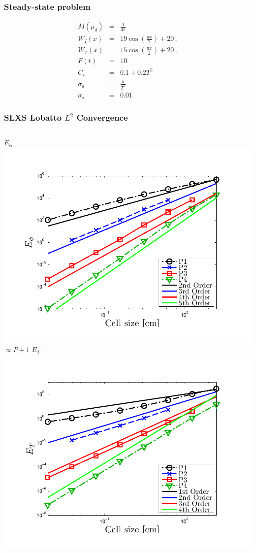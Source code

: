 \documentclass{beamer}
\newcommand{\bea}{\begin{eqnarray*}}  %
\newcommand{\eea}{\end{eqnarray*}}
\newcommand{\pec}{\, ,}
\begin{document}
\begin{frame}

\frametitle{Steady-state problem}
\bea
M(\mu_d) &=& \frac{1}{4\pi} \\
W_I(x) &=& 19 \cos\left( \frac{\pi x}{2} \right) + 20 \pec \\
W_T(x) &=&  15 \cos\left( \frac{\pi x}{2}  \right) + 20 \pec \\
F(t) &=&  10 \\
C_v &=& 0.1 + 0.2 T^2 \\
\sigma_a &=& \frac{5}{T^2} \\
\sigma_s &=& 0.01 
\eea

\end{frame}

\begin{frame}
\frametitle{SLXS Lobatto $L^2$ Convergence}
\begin{columns}[t]
\centering
$E_{\phi}$
\includegraphics[width=\textwidth,trim=0.25in  0.2in 0.75in 0.5in,clip=true]{../chapter6_grey_radtran/Dissertation_Data/Constant_Time_SLXS_Lobatto_phi_L2.pdf}
\\
$\propto P+1$
\centering
$E_{T}$
\includegraphics[width=\textwidth,trim=0.25in  0.2in 0.75in 0.5in,clip=true]{../chapter6_grey_radtran/Dissertation_Data/Constant_Time_SLXS_Lobatto_temp_L2.pdf}

\end{columns}
\end{frame}
\end{document}
